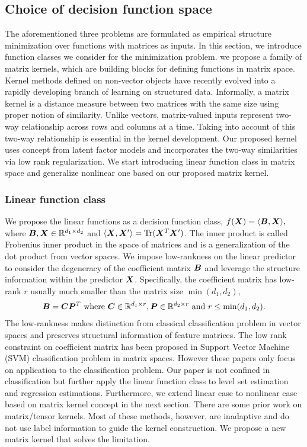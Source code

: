\documentclass[12pt]{article}
\begin{document}
\subsection{Choice of decision function space}\label{sec:fcn class}
The aforementioned three problems are formulated as empirical structure minimization over functions with matrices as inputs.
In this section, we introduce function classes we consider for the minimization problem. we propose a family of matrix kernels, which are building blocks for defining functions in matrix space. Kernel methods defined on non-vector objects have recently evolved into a rapidly developing branch of learning on structured data. Informally, a matrix kernel is a distance measure between two matrices with the same size using proper notion of similarity. Unlike vectors, matrix-valued inputs represent two-way relationship across rows and columns at a time. Taking into account of this two-way relationship is essential in the kernel development.
Our proposed kernel uses concept from latent factor models and incorporates the two-way similarities via low rank regularization. We start introducing linear function class in matrix space and generalize nonlinear one based on our proposed matrix kernel. 

\subsubsection{Linear function class}\label{subsec:linear class}
We propose the linear functions as a decision function class, $f(\bm X) = \langle \bm B,\bm X\rangle,$
where $\bm B,\bm X\in\mathbb{R}^{d_1\times d_2}$ and $\langle \bm X,\bm X'\rangle = \text{Tr}(\bm X^T\bm X')$. The inner product is called Frobenius inner product in the space of matrices and is a generalization of the dot product from vector spaces.
We impose low-rankness on the linear predictor to consider the degeneracy of the coefficient matrix $\bm B$ and leverage the structure information within the predictor $\bm X$.
Specifically,  the coefficient matrix has low-rank $r$  usually much smaller than the matrix size  $\min(d_1,d_2)$,
\begin{align}\label{eq:lowrank}
\bm B = \bm C\bm{P}^T \text{ where } \bm C \in\mathbb{R}^{d_1\times r} ,\bm{P}\in\mathbb{R}^{d_2\times r}\text{ and } r\leq\min(d_1,d_2).
\end{align}
The low-rankness makes distinction from classical classification problem in vector spaces and preserves structural information of feature matrices. The low rank constraint on coefficient matrix has been proposed in Support Vector Machine (SVM) classification problem \citep{pirsiavash2009bilinear,luo2015support} in matrix spaces. However these papers only focus on application to the classification problem. Our paper is not confined in classification but further apply the linear function class to level set estimation and regression estimations. Furthermore, we extend linear case to nonlinear case based on matrix kernel concept in the next section. There are some prior work on matrix/tensor kernels. Most of these methods, however, are inadaptive and do not use label information to guide the kernel construction. We propose a new matrix kernel that solves the limitation.
\end{document}
